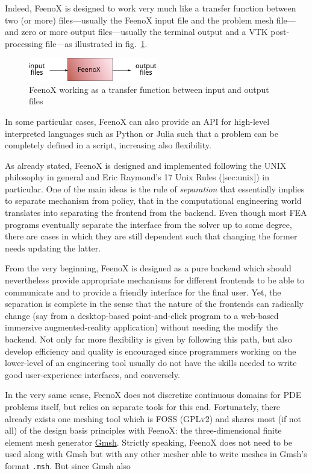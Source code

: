 \documentclass[
  american,
]{article}
\begin{document}
Indeed, FeenoX is designed to work very much like a transfer function
between two (or more) files---usually the FeenoX input file and the
problem mesh file---and zero or more output files---usually the terminal
output and a VTK post-processing file---as illustrated in
fig.~\ref{fig:transfer}.

\begin{figure}
\hypertarget{fig:transfer}{%
\centering
\includegraphics[width=0.5\textwidth,height=\textheight]{transfer.svg}
\caption{FeenoX working as a transfer function between input and output
files}\label{fig:transfer}
}
\end{figure}

In some particular cases, FeenoX can also provide an API for high-level
interpreted languages such as Python or Julia such that a problem can be
completely defined in a script, increasing also flexibility.

As already stated, FeenoX is designed and implemented following the UNIX
philosophy in general and Eric Raymond's 17 Unix Rules ({[}sec:unix{]})
in particular. One of the main ideas is the rule of \emph{separation}
that essentially implies to separate mechanism from policy, that in the
computational engineering world translates into separating the frontend
from the backend. Even though most FEA programs eventually separate the
interface from the solver up to some degree, there are cases in which
they are still dependent such that changing the former needs updating
the latter.

From the very beginning, FeenoX is designed as a pure backend which
should nevertheless provide appropriate mechanisms for different
frontends to be able to communicate and to provide a friendly interface
for the final user. Yet, the separation is complete in the sense that
the nature of the frontends can radically change (say from a
desktop-based point-and-click program to a web-based immersive
augmented-reality application) without needing the modify the backend.
Not only far more flexibility is given by following this path, but also
develop efficiency and quality is encouraged since programmers working
on the lower-level of an engineering tool usually do not have the skills
needed to write good user-experience interfaces, and conversely.

In the very same sense, FeenoX does not discretize continuous domains
for PDE problems itself, but relies on separate tools for this end.
Fortunately, there already exists one meshing tool which is FOSS (GPLv2)
and shares most (if not all) of the design basis principles with FeenoX:
the three-dimensional finite element mesh generator
\href{http://gmsh.info/}{Gmsh}. Strictly speaking, FeenoX does not need
to be used along with Gmsh but with any other mesher able to write
meshes in Gmsh's format \passthrough{\lstinline!.msh!}. But since Gmsh
also
\end{document}
